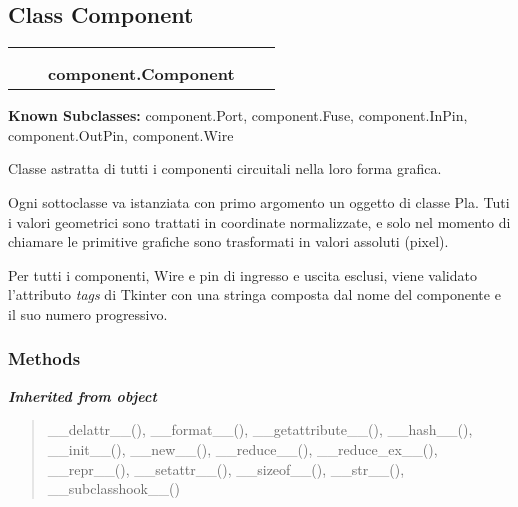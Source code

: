 \subsection{Class Component}

    \label{component:Component}
\begin{tabular}{cccccc}
\multicolumn{2}{r}{\settowidth{\BCL}{object}\multirow{2}{\BCL}{object}}
&&
  \\\cline{3-3}
  &&\multicolumn{1}{c|}{}
&&
  \\
&&\multicolumn{2}{l}{\textbf{component.Component}}
\end{tabular}

\textbf{Known Subclasses:}
component.Port,
    component.Fuse,
    component.InPin,
    component.OutPin,
    component.Wire

Classe astratta di tutti i componenti circuitali nella loro forma grafica.

Ogni sottoclasse va istanziata con primo argomento un oggetto di classe 
Pla. Tuti i valori geometrici sono trattati in coordinate normalizzate, e 
solo nel momento di chiamare le primitive grafiche sono trasformati in 
valori assoluti (pixel).

Per tutti i componenti, Wire e pin di ingresso e uscita esclusi, viene 
validato l'attributo \textit{tags} di Tkinter con una stringa composta dal 
nome del componente e il suo numero progressivo.



  \subsubsection{Methods}


\large{\textbf{\textit{Inherited from object}}}

\begin{quote}
\_\_delattr\_\_(), \_\_format\_\_(), \_\_getattribute\_\_(), \_\_hash\_\_(), \_\_init\_\_(), \_\_new\_\_(), \_\_reduce\_\_(), \_\_reduce\_ex\_\_(), \_\_repr\_\_(), \_\_setattr\_\_(), \_\_sizeof\_\_(), \_\_str\_\_(), \_\_subclasshook\_\_()
\end{quote}


